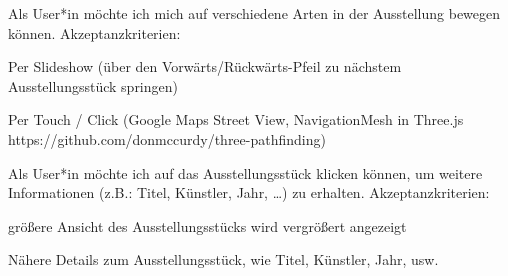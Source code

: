 \begin{compactenum}       
  \item Als User*in möchte ich mich auf verschiedene Arten in der Ausstellung bewegen können. Akzeptanzkriterien:
  \begin{compactitem}
      \item Per Slideshow (über den Vorwärts/Rückwärts-Pfeil zu nächstem Ausstellungsstück springen)
      \item Per Touch / Click (Google Maps Street View, NavigationMesh in Three.js https://github.com/donmccurdy/three-pathfinding)
  \end{compactitem}
  \item  Als User*in möchte ich auf das Ausstellungsstück klicken können, um weitere Informationen (z.B.: Titel, Künstler, Jahr, …) zu erhalten. Akzeptanzkriterien:
  \begin{compactitem}
      \item größere Ansicht des Ausstellungsstücks wird vergrößert angezeigt
      \item Nähere Details zum Ausstellungsstück, wie Titel, Künstler, Jahr, usw.
  \end{compactitem}
\end{compactenum}